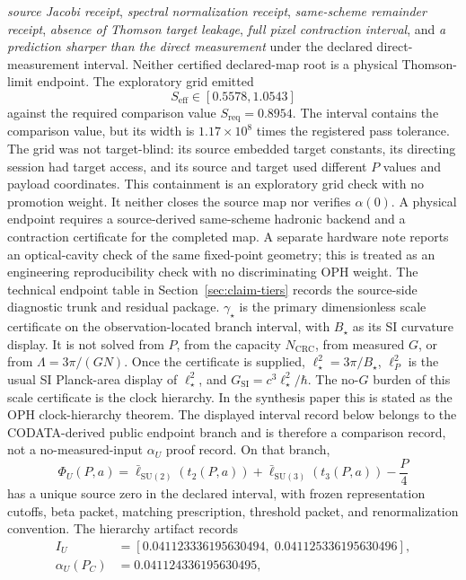 \documentclass[11pt]{article}
\begin{document}
\emph{source Jacobi receipt},
\emph{spectral normalization receipt},
\emph{same-scheme remainder receipt},
\emph{absence of Thomson target leakage},
\emph{full pixel contraction interval}, and
\emph{a prediction sharper than the direct measurement} under the
declared direct-measurement interval.
Neither certified declared-map root is a physical Thomson-limit endpoint. The
exploratory grid emitted
\[
S_{\mathrm{eff}}\in[0.5578,1.0543]
\]
against the required comparison value \(S_{\mathrm{req}}=0.8954\).  The interval
contains the comparison value, but its width is \(1.17\times10^8\) times the
registered pass tolerance. The grid was not target-blind: its source embedded target
constants, its directing session had target access, and its source and target
used different \(P\) values and payload coordinates. This containment is an
exploratory grid check with no promotion weight. It neither closes the source map nor verifies
\(\alpha(0)\).  A physical endpoint requires a source-derived same-scheme
hadronic backend and a contraction certificate for the completed map.
A separate hardware note reports an optical-cavity check of the same fixed-point
geometry; this is treated as an engineering reproducibility check with no discriminating OPH
weight. The technical
endpoint table in Section~\ref{sec:claim-tiers} records the source-side diagnostic
trunk and residual package.
\(\gamma_\star\) is the primary dimensionless scale certificate on the observation-located branch
interval, with \(B_\star\) as its SI curvature display. It is not solved from \(P\), from the
capacity \(N_{\mathrm{CRC}}\), from measured \(G\), or from \(\Lambda=3\pi/(GN)\). Once the
certificate is supplied, \(\ell_\star^2=3\pi/B_\star\), \(\ell_P^2\) is the usual SI
Planck-area display of \(\ell_\star^2\), and
\(G_{\mathrm{SI}}=c^3\ell_\star^2/\hbar\).
The no-\(G\) burden of this scale certificate is the clock hierarchy. In the synthesis paper
this is stated as the OPH clock-hierarchy theorem. The displayed interval record below belongs to
the CODATA-derived public endpoint branch and is therefore a comparison record, not a
no-measured-input \(\alpha_U\) proof record. On that branch,
\[
\Phi_U(P,a)
=
\bar\ell_{\mathrm{SU}(2)}(t_2(P,a))
+
\bar\ell_{\mathrm{SU}(3)}(t_3(P,a))
-
\frac{P}{4}
\]
has a unique source zero in the declared interval, with frozen representation cutoffs, beta
packet, matching prescription, threshold packet, and renormalization convention. The hierarchy
artifact records
\[
\begin{aligned}
I_U&=[0.041123336195630494,\;0.041125336195630496],\\
\alpha_U(P_C)&=0.041124336195630495,
\end{aligned}
\]
\end{document}
